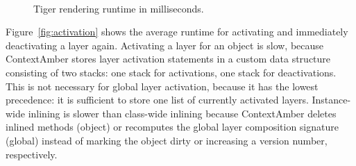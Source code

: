 \documentclass{sig-alternate}
\begin{document}
\begin{figure}[t]
     \\
    \caption{Tiger rendering runtime in milliseconds.}
    \label{fig:rendering_runtime}
\end{figure}

Figure~\ref{fig:activation} shows the average runtime for activating and immediately deactivating a layer again. Activating a layer for an object is slow, because ContextAmber stores layer activation statements in a custom data structure consisting of two stacks: one stack for activations, one stack for deactivations. This is not necessary for global layer activation, because it has the lowest precedence: it is sufficient to store one list of currently
activated layers. Instance-wide inlining is slower than class-wide inlining because ContextAmber deletes inlined methods (object) or recomputes the global layer composition signature (global) instead of marking the object dirty or increasing a version number, respectively.
\end{document}
